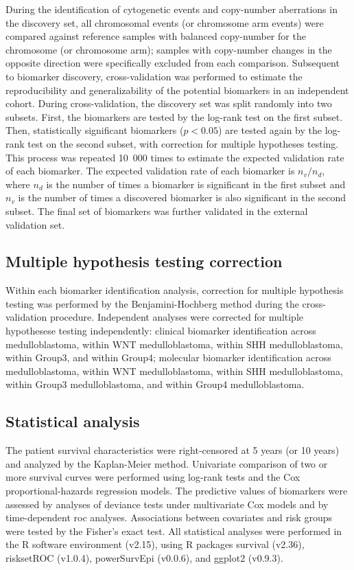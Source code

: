 During the identification of cytogenetic events and copy-number aberrations in the discovery set, all chromosomal events (or chromosome arm events) were compared against reference samples with balanced copy-number for the chromosome (or chromosome arm); samples with copy-number changes in the opposite direction were specifically excluded from each comparison. Subsequent to biomarker discovery, cross-validation was performed to estimate the reproducibility and generalizability of the potential biomarkers in an independent cohort. During cross-validation, the discovery set was split randomly into two subsets. First, the biomarkers are tested by the log-rank test on the first subset. Then, statistically significant biomarkers ($p < 0.05$) are tested again by the log-rank test on the second subset, with correction for multiple hypotheses testing. This process was repeated 10~000 times to estimate the expected validation rate of each biomarker. The expected validation rate of each biomarker is $n_v / n_d$, where $n_d$ is the number of times a biomarker is significant in the first subset and $n_v$ is the number of times a discovered biomarker is also significant in the second subset. The final set of biomarkers was further validated in the external validation set.

\subsection{Multiple hypothesis testing correction}

Within each biomarker identification analysis, correction for multiple hypothesis testing was performed by the Benjamini-Hochberg method during the cross-validation procedure. Independent analyses were corrected for multiple hypothesese testing independently: clinical biomarker identification across medulloblastoma, within WNT medulloblastoma, within SHH medulloblastoma, within Group3, and within Group4; molecular biomarker identification across medulloblastoma, within WNT medulloblastoma, within SHH medulloblastoma, within Group3 medulloblastoma, and within Group4 medulloblastoma.

\subsection{Statistical analysis}

The patient survival characteristics were right-censored at 5 years (or 10 years) and analyzed by the Kaplan-Meier method. Univariate comparison of two or more survival curves were performed using log-rank tests and the Cox proportional-hazards regression models. The predictive values of biomarkers were assessed by analyses of deviance tests under multivariate Cox models and by time-dependent \gls{roc} analyses. Associations between covariates and risk groups were tested by the Fisher’s exact test. All statistical analyses were performed in the R software environment (v2.15), using R packages survival (v2.36), risksetROC (v1.0.4), powerSurvEpi (v0.0.6), and ggplot2 (v0.9.3).

